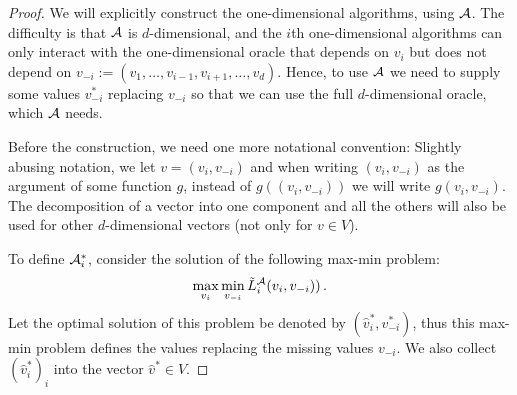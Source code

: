 \begin{proof}
We will explicitly construct the one-dimensional algorithms, using $\mathcal{A}$. The difficulty is that $\mathcal{A}$ is $d$-dimensional, and the $i$th one-dimensional algorithms can only interact with the one-dimensional oracle
that depends on $v_i$ but does not depend on  $v_{-i}:=(v_1,\ldots,v_{i-1},v_{i+1},\ldots,v_d)$.
Hence, to use $\mathcal{A}$ we need to supply some values $v_{-i}^*$ replacing $v_{-i}$ so that we can use 
the full $d$-dimensional oracle, which $\mathcal{A}$ needs.

Before the construction, we need one more notational convention: 
Slightly abusing notation, we let $v = (v_i,v_{-i})$ and when writing $(v_i,v_{-i})$ as the argument of some function $g$, instead of $g( (v_i,v_{-i}) )$ we will write $g( v_i,v_{-i})$. The decomposition of a vector into one component and all the others will also be used for other $d$-dimensional vectors (not only for $v\in V$).

To define $\mathcal{A}_i^*$, consider the solution of the following max-min problem:
\[
\max_{v_i} \min_{v_{-i}} \tilde{L}^{\mathcal{A}}_i(v_i, v_{-i}))\,.
\]
Let the optimal solution of this problem be denoted by $(\hat{v}_i^*,v_{-i}^*)$, thus this max-min
problem defines the values replacing the missing values $v_{-i}$.
We also collect $(\hat{v}_i^*)_i$ into the vector $\hat{v}^*\in V$.


\end{proof}
